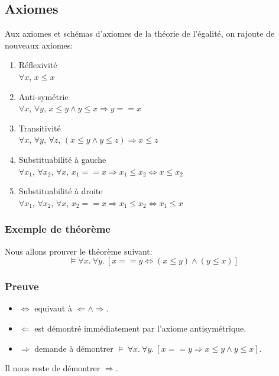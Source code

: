 {\subsection{Axiomes} 

Aux axiomes et schémas d'axiomes de la théorie de l'égalité, on rajoute de nouveaux axiomes:
\begin{enumerate}
\item Réflexivité \\$\forall x$, $x\leq x$
\item Anti-symétrie \\$\forall x$, $\forall y$, $ x\leq y \land y\leq x\Rightarrow y==x$
\item Transitivité \\$\forall x$, $\forall y$, $\forall z$, $(x\leq y \land y\leq z) \Rightarrow x\leq z$
\item Substituabilité à gauche \\$\forall x_{1}$, $\forall x_{2}$, $\forall x$,  $x_{1}==x \Rightarrow x_{1}\leq x_{2} \Leftrightarrow x \leq x_{2}$
\item Substituabilité à droite \\$\forall x_{1}$, $\forall x_{2}$, $\forall x$,  $x_{2}==x \Rightarrow x_{1}\leq x_{2} \Leftrightarrow x_{1} \leq x$
\end{enumerate}

\subsubsection{Exemple de théorème}

Nous allons prouver le théorème suivant:
$$\models \forall x.\ \forall y.\  [x==y \Leftrightarrow (x\leq y)\land (y \leq x)] $$

\subsubsection{Preuve}

\begin{itemize}
\item $\Leftrightarrow$ equivaut à $\Leftarrow \land \Rightarrow$.
\item $\Leftarrow$ est démontré immédiatement par l'axiome antisymétrique.
\item $\Rightarrow$ demande à démontrer $\models{}\ \forall x.\ \forall y.\ [x==y \Rightarrow x\leq y \land y \leq x]$.
\end{itemize}
Il nous reste de démontrer $\Rightarrow$.

}
